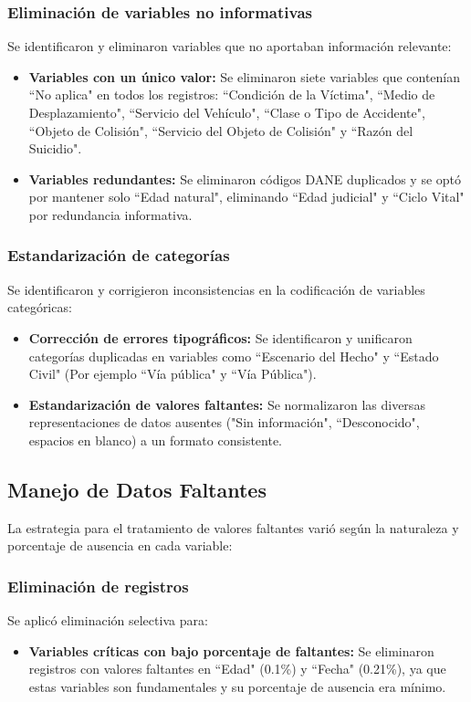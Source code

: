 \documentclass[lettersize,journal]{IEEEtran}
\begin{document}
\subsubsection{Eliminación de variables no informativas}
Se identificaron y eliminaron variables que no aportaban información relevante:
\begin{itemize}
\item \textbf{Variables con un único valor:} Se eliminaron siete variables que contenían ``No aplica" en todos los registros: ``Condición de la Víctima", ``Medio de Desplazamiento", ``Servicio del Vehículo", ``Clase o Tipo de Accidente", ``Objeto de Colisión", ``Servicio del Objeto de Colisión" y ``Razón del Suicidio".
\item \textbf{Variables redundantes:} Se eliminaron códigos DANE duplicados y se optó por mantener solo ``Edad natural", eliminando ``Edad judicial" y ``Ciclo Vital" por redundancia informativa.
\end{itemize}
\subsubsection{Estandarización de categorías}
Se identificaron y corrigieron inconsistencias en la codificación de variables categóricas:
\begin{itemize}
\item \textbf{Corrección de errores tipográficos:} Se identificaron y unificaron categorías duplicadas en variables como ``Escenario del Hecho" y ``Estado Civil" (Por ejemplo ``Vía pública" y ``Vía Pública").
\item \textbf{Estandarización de valores faltantes:} Se normalizaron las diversas representaciones de datos ausentes ("Sin información", ``Desconocido", espacios en blanco) a un formato consistente.

\end{itemize}
\subsection{Manejo de Datos Faltantes}
La estrategia para el tratamiento de valores faltantes varió según la naturaleza y porcentaje de ausencia en cada variable:
\subsubsection{Eliminación de registros}
Se aplicó eliminación selectiva para:
\begin{itemize}
\item \textbf{Variables críticas con bajo porcentaje de faltantes:} Se eliminaron registros con valores faltantes en ``Edad" (0.1\%) y ``Fecha" (0.21\%), ya que estas variables son fundamentales y su porcentaje de ausencia era mínimo.
\end{itemize}
\end{document}
